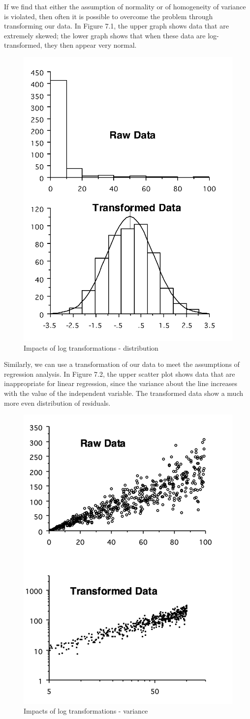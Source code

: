 \documentclass[
]{book}
\begin{document}
If we find that either the assumption of normality or of homogeneity of variance is violated, then often it is possible to overcome the problem through transforming our data. In Figure 7.1, the upper graph shows data that are extremely skewed; the lower graph shows that when these data are log- transformed, they then appear very normal.

\begin{figure}
\includegraphics[width=0.4\linewidth]{figures/distributions} \caption{Impacts of log transformations - distribution}\label{fig:unnamed-chunk-68}
\end{figure}

Similarly, we can use a transformation of our data to meet the assumptions of regression analysis. In Figure 7.2, the upper scatter plot shows data that are inappropriate for linear regression, since the variance about the line increases with the value of the independent variable. The transformed data show a much more even distribution of residuals.

\begin{figure}
\includegraphics[width=0.4\linewidth]{figures/log_scatter} \caption{Impacts of log transformations - variance}\label{fig:unnamed-chunk-69}
\end{figure}
\end{document}
